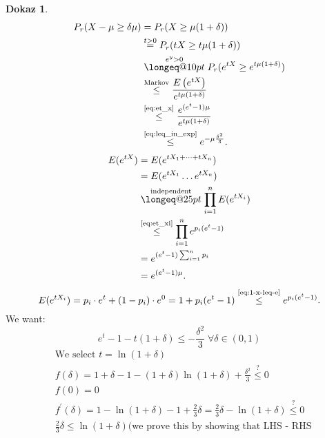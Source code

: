 \documentclass[a4paper, 12pt]{book}
\makeatletter
\theoremstyle{definition}
\newtheorem{pro}[counter]{Dokaz}
\theoremstyle{remark}
\newcommand{\longeq}[1]{\mathrel{\mathpalette\longeq@{#1}}}
\newcommand{\longeq@}[2]{%
  \begingroup
  \sbox\z@{$\m@th#1=$}%
  \ifdim#2<\wd\z@
    \resizebox{#2}{\height}{\box\z@}%
  \else
    \ifdim#2<3\wd\z@
      \hbox to #2{$\m@th#1=\hss=\hss=\hss=$}%
    \else
      \hbox to #2{$\m@th#1=\cleaders\hbox to 0.2\wd\z@{\hss$#1=$\hss}\hfil=$}%
    \fi
  \fi
  \endgroup
}
\makeatother
\begin{document}
\begin{pro}
  \begin{align*}
    P_r(X - \mu \geq \delta \mu) &= P_r(X \geq \mu(1+\delta)) \\
    &\stackrel{t>0}{=} P_r(tX \geq t\mu(1+\delta)) \\
    &\stackrel{e^y>0}{\longeq{10pt}} P_r(e^{tX} \geq e^{t\mu(1+\delta)}) \\
    &\stackrel{\text{Markov}}{\leq} \frac{E\left(e^{tX}\right)}{e^{t\mu(1+\delta)}} \\
    &\stackrel{\refeq{eq:et_x}}{\leq} \frac{e^{(e^t-1)\mu}}{e^{t\mu(1+\delta)}} \\
    &\stackrel{\refeq{eq:leq_in_exp}}{\leq} e^{-\mu \frac{\delta^2}{3}}.
  \end{align*}
  \begin{align}
    E(e^{tX}) &= E(e^{tX_1 + \dots + tX_n}) \nonumber \\
    &= E(e^{tX_1} \dots e^{tX_n}) \nonumber \\
    &\stackrel{\text{independent}}{\longeq{25pt}} \prod_{i=1}^{n} E(e^{tX_i}) \nonumber \\
    &\stackrel{\refeq{eq:et_xi}}{\leq} \prod_{i=1}^{n} e^{p_i(e^t-1)} \nonumber \\
    &= e^{(e^t-1) \sum_{i=1}^{n}p_i} \nonumber \\
    &= e^{(e^t-1)\mu} \label{eq:et_x}.
  \end{align}
  \begin{equation}
    E(e^{tX_i}) = p_i \cdot e^t + (1-p_i) \cdot e^0 = 1+p_i(e^t-1) \stackrel{\refeq{eq:1-x-leq-e}}{\leq} e^{p_i(e^t-1)}.
    \label{eq:et_xi}
  \end{equation}
  We want:
  \begin{equation}
    e^t - 1 - t(1+\delta) \leq -\frac{\delta^2}{3} \; \forall \delta \in (0,1) \label{eq:leq_in_exp}
  \end{equation}
  \begin{align*}
    &\text{We select }t = \ln(1+\delta) \\
    &f(\delta) = 1 + \delta - 1 - (1+\delta) \ln(1+\delta) + \frac{\delta^2}{3} \stackrel{?}{\leq} 0 \\
    &f(0) = 0 \\
    &f^{'}(\delta) = 1 - \ln(1+\delta) - 1 + \frac{2}{3} \delta = \frac{2}{3} \delta - \ln(1+\delta) \stackrel{?}{\leq} 0 \\
    &\frac{2}{3} \delta \leq \ln(1+\delta) (\text{we prove this by showing that LHS - RHS}\\

\end{align*}
\end{pro}
\end{document}
